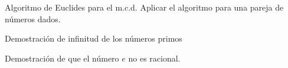 \begin{problem}[24]
Algoritmo de Euclides para el m.c.d. Aplicar el algoritmo para una pareja de números dados.
\solution

\end{problem}

\begin{problem}[25]
Demostración de infinitud de los números primos
\solution

\end{problem}

\begin{problem}[26]
Demostración de que el número $e$ no es racional.
\solution

\end{problem}